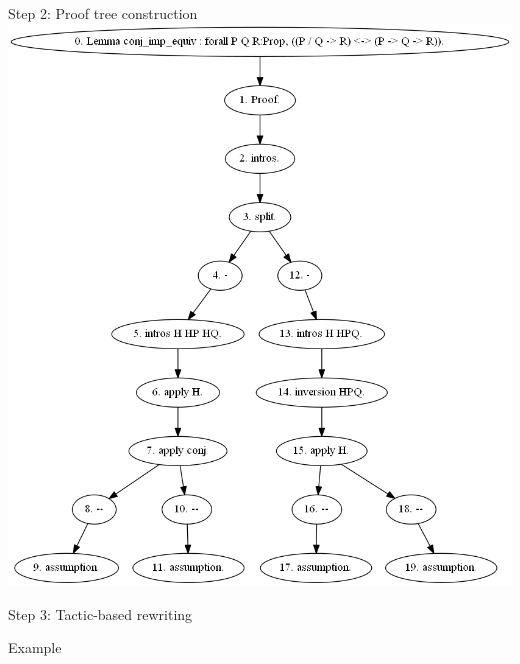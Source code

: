 \documentclass[pdf]{beamer}
\begin{document}
\begin{frame}{Step 2: Proof tree construction}
    \vspace{-13pt}\center\includegraphics[height=0.85\textheight]{images/proof-tree.png}
\end{frame}

\begin{frame}{Step 3: Tactic-based rewriting}

\end{frame}

\begin{frame}{Example}
\end{frame}
\end{document}
